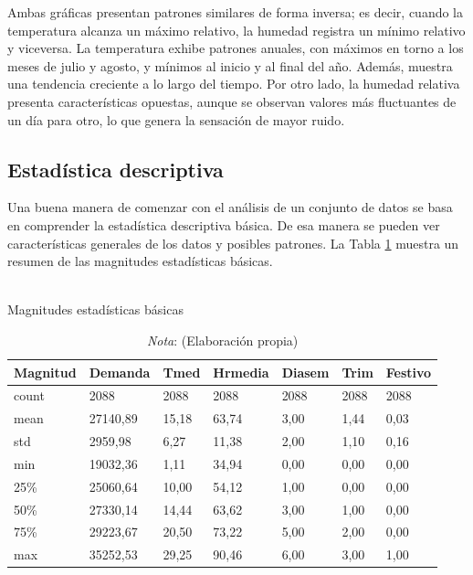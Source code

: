 \documentclass[12pt,a4paper]{report}
\begin{document}
Ambas gráficas presentan patrones similares de forma inversa; es decir, cuando la temperatura alcanza un máximo relativo, la humedad registra un mínimo relativo y viceversa. La temperatura exhibe patrones anuales, con máximos en torno a los meses de julio y agosto, y mínimos al inicio y al final del año. Además, muestra una tendencia creciente a lo largo del tiempo. Por otro lado, la humedad relativa presenta características opuestas, aunque se observan valores más fluctuantes de un día para otro, lo que genera la sensación de mayor ruido.

\subsection{Estadística descriptiva}

Una buena manera de comenzar con el análisis de un conjunto de datos se basa en comprender la estadística descriptiva básica. De esa manera se pueden ver características generales de los datos y posibles patrones. La Tabla \ref{tbl:est_stat} muestra un resumen de las magnitudes estadísticas básicas.


\begin{table}[H]
\centering
\caption{\\ Magnitudes estadísticas básicas}
\renewcommand{\arraystretch}{1.2}
\begin{tabular}{lllllll}
\toprule
\textbf{Magnitud} & \textbf{Demanda} & \textbf{Tmed} & \textbf{Hrmedia} & \textbf{Diasem} & \textbf{Trim} & \textbf{Festivo} \\ \midrule

count   & 2088  & 2088 & 2088  & 2088  & 2088 & 2088 \\  \hline
mean    & 27140,89 & 15,18    & 63,74    & 3,00     & 1,44     & 0,03 \\ \hline
std     & 2959,98  & 6,27     & 11,38    & 2,00     & 1,10     & 0,16 \\ \hline
min     & 19032,36 & 1,11     & 34,94    & 0,00     & 0,00     & 0,00 \\ \hline
25\%    & 25060,64 & 10,00    & 54,12    & 1,00     & 0,00     & 0,00 \\ \hline
50\%    & 27330,14 & 14,44    & 63,62    & 3,00     & 1,00     & 0,00 \\ \hline
75\%    & 29223,67 & 20,50    & 73,22    & 5,00     & 2,00     & 0,00 \\ \hline
max     & 35252,53 & 29,25    & 90,46    & 6,00     & 3,00     & 1,00 \\ 

\bottomrule
\end{tabular}
\label{tbl:est_stat}
\caption*{\textit{Nota}: (Elaboración propia)}
\end{table}
\end{document}
